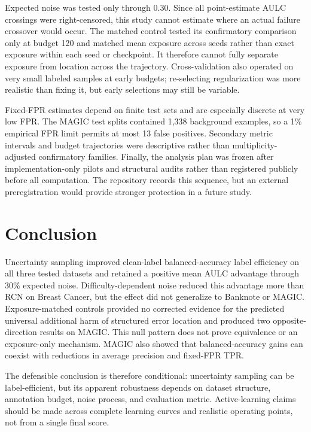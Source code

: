 \documentclass[11pt]{article}
\begin{document}
Expected noise was tested only through 0.30. Since all point-estimate AULC
crossings were right-censored, this study cannot estimate where an actual
failure crossover would occur. The matched control tested its confirmatory
comparison only at budget 120 and matched mean exposure across seeds rather
than exact exposure within each seed or checkpoint. It therefore cannot fully
separate exposure from location across the trajectory. Cross-validation also
operated on very small labeled samples at early budgets; re-selecting
regularization was more realistic than fixing it, but early selections may
still be variable.

Fixed-FPR estimates depend on finite test sets and are especially discrete at
very low FPR. The MAGIC test splits contained 1,338 background examples, so a
1\% empirical FPR limit permits at most 13 false positives. Secondary metric
intervals and budget trajectories were descriptive rather than
multiplicity-adjusted confirmatory families. Finally, the analysis plan was
frozen after implementation-only pilots and structural audits rather than
registered publicly before all computation. The repository records this
sequence, but an external preregistration would provide stronger protection
in a future study.

\section{Conclusion}

Uncertainty sampling improved clean-label balanced-accuracy label efficiency
on all three tested datasets and retained a positive mean AULC advantage
through 30\% expected noise. Difficulty-dependent noise reduced this advantage
more than RCN on Breast Cancer, but the effect did not generalize to Banknote
or MAGIC. Exposure-matched controls provided no corrected evidence for the
predicted universal additional harm of structured error location and produced
two opposite-direction results on MAGIC. This null pattern does not prove
equivalence or an exposure-only mechanism. MAGIC also showed that
balanced-accuracy gains can coexist with reductions in average precision and
fixed-FPR TPR.

The defensible conclusion is therefore conditional: uncertainty sampling can
be label-efficient, but its apparent robustness depends on dataset structure,
annotation budget, noise process, and evaluation metric. Active-learning
claims should be made across complete learning curves and realistic operating
points, not from a single final score.
\end{document}
